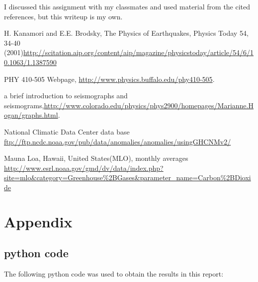 \documentclass[11pt,letterpaper]{article}
\begin{document}
I discussed this assignment with my classmates and used material from the
cited references, but this writeup is my own.

\begin{thebibliography}{9}

H. Kanamori and E.E. Brodsky, The Physics of Earthquakes, Physics Today 54, 34-40 (2001)\url{http://scitation.aip.org/content/aip/magazine/physicstoday/article/54/6/10.1063/1.1387590}

PHY 410-505 Webpage, \url{http://www.physics.buffalo.edu/phy410-505}.

a brief introduction to seismographs and seismograms,\url{http://www.colorado.edu/physics/phys2900/homepages/Marianne.Hogan/graphs.html}.

National Climatic Data Center data base \url{ftp://ftp.ncdc.noaa.gov/pub/data/anomalies/anomalies/usingGHCNMv2/}

Mauna Loa, Hawaii, United States(MLO), monthly averages
\url{http://www.esrl.noaa.gov/gmd/dv/data/index.php?site=mlo&category=Greenhouse%2BGases&parameter_name=Carbon%2BDioxide}

\end{thebibliography}

\newpage
\appendix
\section{Appendix}

\subsection{python code}

The following python code was used to obtain the results in this report:




\end{document}
